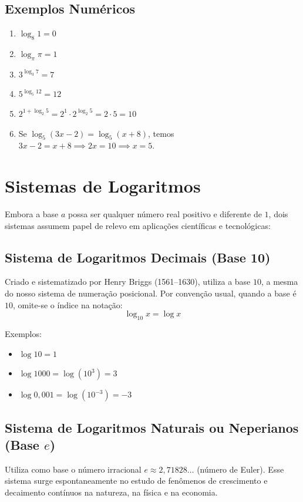 \documentclass[12pt,a4paper]{report}
\begin{document}
	\subsection*{Exemplos Numéricos}
	
	\begin{enumerate}[label=\textbf{\alph*)}]
		\item $\log_8 1 = 0$
		\item $\log_{\pi} \pi = 1$
		\item $3^{\log_3 7} = 7$
		\item $5^{\log_5 12} = 12$
		\item $2^{1 + \log_2 5} = 2^1 \cdot 2^{\log_2 5} = 2 \cdot 5 = 10$
		\item Se $\log_5 (3x - 2) = \log_5 (x + 8)$, temos $3x - 2 = x + 8 \implies 2x = 10 \implies x = 5$.
	\end{enumerate}
	
	\section{Sistemas de Logaritmos}
	
	Embora a base $a$ possa ser qualquer número real positivo e diferente de $1$, dois sistemas assumem papel de relevo em aplicações científicas e tecnológicas:
	
	\subsection{Sistema de Logaritmos Decimais (Base 10)}
	Criado e sistematizado por Henry Briggs (1561--1630), utiliza a base $10$, a mesma do nosso sistema de numeração posicional. Por convenção usual, quando a base é $10$, omite-se o índice na notação:
	$$\log_{10} x = \log x$$
	
	Exemplos:
	\begin{itemize}[label=$\circ$]
		\item $\log 10 = 1$
		\item $\log 1000 = \log (10^3) = 3$
		\item $\log 0{,}001 = \log (10^{-3}) = -3$
	\end{itemize}
	
	\subsection{Sistema de Logaritmos Naturais ou Neperianos (Base $e$)}
	Utiliza como base o número irracional $e \approx 2{,}71828\dots$ (número de Euler). Esse sistema surge espontaneamente no estudo de fenômenos de crescimento e decaimento contínuos na natureza, na física e na economia. 
	
\end{document}
